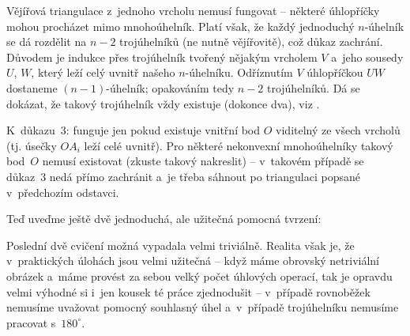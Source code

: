 {    Vějířová triangulace z~jednoho vrcholu nemusí fungovat -- některé úhlopříčky mohou procházet mimo mnohoúhelník. Platí však, že každý jednoduchý $n$-úhelník se dá rozdělit na $n-2$ trojúhelníků (ne nutně vějířovitě), což důkaz zachrání. Důvodem je indukce přes trojúhelník tvořený nějakým vrcholem $V$ a~jeho sousedy $U$, $W$, který leží celý uvnitř našeho $n$-úhelníku. Odříznutím $V$ úhlopříčkou $UW$ dostaneme $(n-1)$-úhelník; opakováním tedy $n-2$ trojúhelníků. Dá se dokázat, že takový trojúhelník vždy existuje (dokonce dva), viz .

    K~důkazu~3: funguje jen pokud existuje vnitřní bod $O$ viditelný ze všech vrcholů (tj. úsečky $OA_i$ leží celé uvnitř). Pro některé nekonvexní mnohoúhelníky takový bod~$O$ nemusí existovat (zkuste takový nakreslit) -- v~takovém případě se důkaz~3 nedá přímo zachránit a~je třeba sáhnout po triangulaci popsané v~předchozím odstavci.
}

Teď uveďme ještě dvě jednoduchá, ale užitečná pomocná tvrzení:



Poslední dvě cvičení možná vypadala velmi triviálně. Realita však je, že v~praktických úlohách jsou velmi užitečná -- když máme obrovský netriviální obrázek a~máme provést za sebou velký počet úhlových operací, tak je opravdu velmi výhodné si i~jen kousek té práce zjednodušit -- v~případě rovnoběžek nemusíme uvažovat pomocný souhlasný úhel a~v~případě trojúhelníku nemusíme pracovat s~$180^\circ$.

